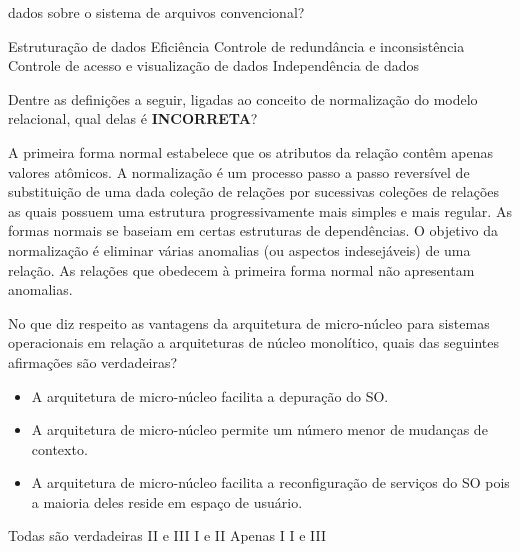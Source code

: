 \documentclass[12pt, addpoints]{exam}
\begin{document}
\begin{questions}
dados sobre o sistema de arquivos convencional?


\begin{choices}
\choice Estruturação de dados
\choice Eficiência
\choice Controle de redundância e inconsistência
\choice Controle de acesso e visualização de dados
\choice Independência de dados
\end{choices}

\question

Dentre as definições a seguir, ligadas ao conceito de normalização do modelo relacional, qual delas é \textbf{INCORRETA}?


\begin{choices}
\choice A primeira forma normal estabelece que os atributos da relação contêm apenas valores atômicos.
\choice A normalização é um processo passo a passo reversível de substituição de uma dada coleção de relações por sucessivas coleções de relações as quais possuem uma estrutura progressivamente mais simples e mais regular.
\choice As formas normais se baseiam em certas estruturas de dependências.
\choice O objetivo da normalização é eliminar várias anomalias (ou aspectos indesejáveis) de uma relação.
\choice As relações que obedecem à primeira forma normal não apresentam anomalias.
\end{choices}

\question

No que diz respeito as vantagens da arquitetura de micro-núcleo para sistemas operacionais em relação a arquiteturas de núcleo monolítico, quais das seguintes afirmações são verdadeiras?



\begin{itemize}

    \item[I] A arquitetura de micro-núcleo facilita a depuração do SO.

    \item[II] A arquitetura de micro-núcleo permite um número menor de mudanças de contexto.

    \item[III] A arquitetura de micro-núcleo facilita a reconfiguração de serviços do SO pois a maioria deles reside em espaço de usuário.

\end{itemize}
\begin{choices}
\choice Todas são verdadeiras
\choice II e III
\choice I e II
\choice Apenas I
\choice I e III
\end{choices}


\end{questions}
\end{document}
